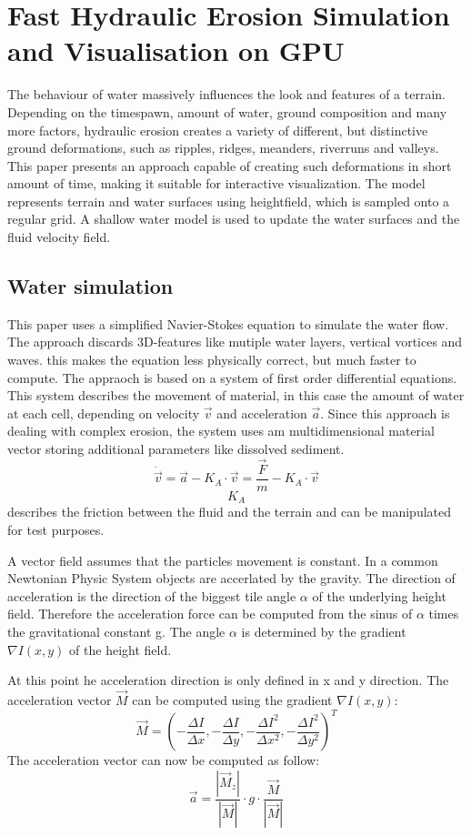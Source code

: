 \section{Fast Hydraulic Erosion Simulation and Visualisation on GPU}
The behaviour of water massively influences the look and features of a terrain. Depending on the timespawn, amount of water, ground composition and many more factors, hydraulic erosion creates a variety of different, but distinctive ground deformations, such as ripples, ridges, meanders, riverruns and valleys. 
This paper \cite{Neidhold:2005:IPB:2381356.2381361} presents an approach capable of creating such deformations in short amount of time, making it suitable for interactive visualization. The model represents terrain and water surfaces using heightfield, which is sampled onto a regular grid. A shallow water model is used to update the water surfaces and the fluid velocity field. 

\subsection{Water simulation}
This paper uses a simplified Navier-Stokes equation to simulate the water flow. The approach discards 3D-features like mutiple water layers, vertical vortices and waves. this makes the equation less physically correct, but much faster to compute. The appraoch is based on a system of first order differential equations. This system describes the movement of material, in this case the amount of water at each cell, depending on velocity $\vec{v}$ and acceleration $\vec{a}$. Since this approach is dealing with complex erosion, the system uses am multidimensional material vector storing additional parameters like dissolved sediment.
$$\dot{\vec{v}} = \vec{a} -K_A \cdot \vec{v}=\frac{\vec{F}}{m} - K_A\cdot \vec{v}$$
$$K_A$$ describes the friction between the fluid and the terrain and can be manipulated for test purposes. 

A vector field assumes that the particles movement is constant. In a common Newtonian Physic System objects are accerlated by the gravity. The direction of acceleration is the direction of the biggest tile angle $\alpha$ of the underlying height field. Therefore the acceleration force can be computed from the sinus of $\alpha$ times the gravitational constant g. The angle $\alpha$ is determined by the gradient $\nabla I(x,y)$ of the height field. 

At this point he acceleration direction is only defined in x and y direction. The acceleration vector $\vec{M}$ can be computed using the gradient $\nabla I(x,y)$: 
$$\vec{M} = (- \frac{\Delta I}{\Delta x}, - \frac{\Delta I}{\Delta y}, - \frac{\Delta I^2}{\Delta x^2}, - \frac{\Delta I^2}{\Delta y^2})^T$$
The acceleration vector can now be computed as follow: 
$$\vec{a}= \frac{|\vec{M}_z|}{|\vec{M}|} \cdot g \cdot \frac{\vec{M}}{|\vec{M}|}$$

